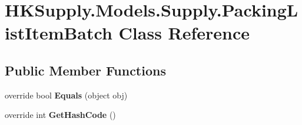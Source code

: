 \hypertarget{class_h_k_supply_1_1_models_1_1_supply_1_1_packing_list_item_batch}{}\section{H\+K\+Supply.\+Models.\+Supply.\+Packing\+List\+Item\+Batch Class Reference}
\label{class_h_k_supply_1_1_models_1_1_supply_1_1_packing_list_item_batch}
\subsection*{Public Member Functions}
\begin{DoxyCompactItemize}
\item 
\mbox{\label{class_h_k_supply_1_1_models_1_1_supply_1_1_packing_list_item_batch_aa46a4bb43eba4652abe4a38a53cd6e7b}} 
override bool {\bfseries Equals} (object obj)
\item 
\mbox{\label{class_h_k_supply_1_1_models_1_1_supply_1_1_packing_list_item_batch_a788b4548a74ed1d21afc68bdd7789606}} 
override int {\bfseries Get\+Hash\+Code} ()
\end{DoxyCompactItemize}
